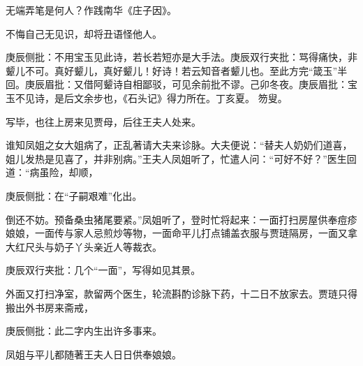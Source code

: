 \begin{poem}
    \begin{pl}无端弄笔是何人？作践南华《庄子因》。\end{pl}

    \begin{pl}不悔自己无见识，却将丑语怪他人。\end{pl}
    \begin{note}庚辰侧批：不用宝玉见此诗，若长若短亦是大手法。庚辰双行夹批：骂得痛快，非颦儿不可。真好颦儿，真好颦儿！好诗！若云知音者颦儿也。至此方完“箴玉”半回。庚辰眉批：又借阿颦诗自相鄙驳，可见余前批不谬。己卯冬夜。庚辰眉批：宝玉不见诗，是后文余步也，《石头记》得力所在。丁亥夏。 笏叟。\end{note}
\end{poem}


\begin{parag}
    写毕，也往上房来见贾母，后往王夫人处来。
\end{parag}


\begin{parag}
    谁知凤姐之女大姐病了，正乱著请大夫来诊脉。大夫便说：“替夫人奶奶们道喜，姐儿发热是见喜了，并非别病。”王夫人凤姐听了，忙遣人问：“可好不好？”医生回道：“病虽险，却顺，\begin{note}庚辰侧批：在“子嗣艰难”化出。\end{note}倒还不妨。预备桑虫猪尾要紧。”凤姐听了，登时忙将起来：一面打扫房屋供奉痘疹娘娘，一面传与家人忌煎炒等物，一面命平儿打点铺盖衣服与贾琏隔房，一面又拿大红尺头与奶子丫头亲近人等裁衣。\begin{note}庚辰双行夹批：几个“一面”，写得如见其景。\end{note}外面又打扫净室，款留两个医生，轮流斟酌诊脉下药，十二日不放家去。贾琏只得搬出外书房来斋戒，\begin{note}庚辰侧批：此二字内生出许多事来。\end{note}凤姐与平儿都随著王夫人日日供奉娘娘。
\end{parag}


